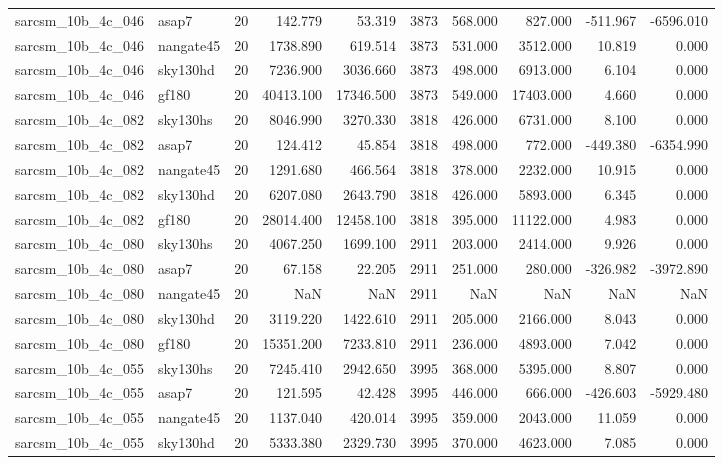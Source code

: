 \documentclass{article}
\begin{document}
\begin{longtable}{llrrrrrrrr}
sarcsm\_10b\_4c\_046 & asap7 & 20 & 142.779 & 53.319 & 3873 & 568.000 & 827.000 & -511.967 & -6596.010 \\
sarcsm\_10b\_4c\_046 & nangate45 & 20 & 1738.890 & 619.514 & 3873 & 531.000 & 3512.000 & 10.819 & 0.000 \\
sarcsm\_10b\_4c\_046 & sky130hd & 20 & 7236.900 & 3036.660 & 3873 & 498.000 & 6913.000 & 6.104 & 0.000 \\
sarcsm\_10b\_4c\_046 & gf180 & 20 & 40413.100 & 17346.500 & 3873 & 549.000 & 17403.000 & 4.660 & 0.000 \\
sarcsm\_10b\_4c\_082 & sky130hs & 20 & 8046.990 & 3270.330 & 3818 & 426.000 & 6731.000 & 8.100 & 0.000 \\
sarcsm\_10b\_4c\_082 & asap7 & 20 & 124.412 & 45.854 & 3818 & 498.000 & 772.000 & -449.380 & -6354.990 \\
sarcsm\_10b\_4c\_082 & nangate45 & 20 & 1291.680 & 466.564 & 3818 & 378.000 & 2232.000 & 10.915 & 0.000 \\
sarcsm\_10b\_4c\_082 & sky130hd & 20 & 6207.080 & 2643.790 & 3818 & 426.000 & 5893.000 & 6.345 & 0.000 \\
sarcsm\_10b\_4c\_082 & gf180 & 20 & 28014.400 & 12458.100 & 3818 & 395.000 & 11122.000 & 4.983 & 0.000 \\
sarcsm\_10b\_4c\_080 & sky130hs & 20 & 4067.250 & 1699.100 & 2911 & 203.000 & 2414.000 & 9.926 & 0.000 \\
sarcsm\_10b\_4c\_080 & asap7 & 20 & 67.158 & 22.205 & 2911 & 251.000 & 280.000 & -326.982 & -3972.890 \\
sarcsm\_10b\_4c\_080 & nangate45 & 20 & NaN & NaN & 2911 & NaN & NaN & NaN & NaN \\
sarcsm\_10b\_4c\_080 & sky130hd & 20 & 3119.220 & 1422.610 & 2911 & 205.000 & 2166.000 & 8.043 & 0.000 \\
sarcsm\_10b\_4c\_080 & gf180 & 20 & 15351.200 & 7233.810 & 2911 & 236.000 & 4893.000 & 7.042 & 0.000 \\
sarcsm\_10b\_4c\_055 & sky130hs & 20 & 7245.410 & 2942.650 & 3995 & 368.000 & 5395.000 & 8.807 & 0.000 \\
sarcsm\_10b\_4c\_055 & asap7 & 20 & 121.595 & 42.428 & 3995 & 446.000 & 666.000 & -426.603 & -5929.480 \\
sarcsm\_10b\_4c\_055 & nangate45 & 20 & 1137.040 & 420.014 & 3995 & 359.000 & 2043.000 & 11.059 & 0.000 \\
sarcsm\_10b\_4c\_055 & sky130hd & 20 & 5333.380 & 2329.730 & 3995 & 370.000 & 4623.000 & 7.085 & 0.000 \\

\end{longtable}
\end{document}
